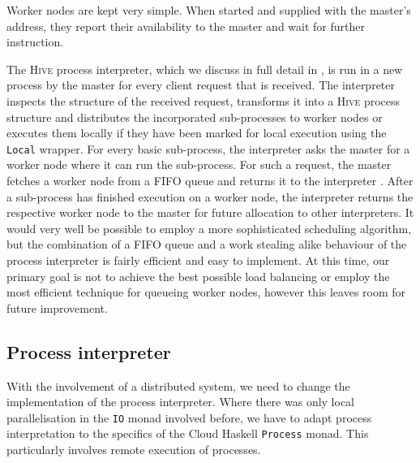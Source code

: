 Worker nodes are kept very simple. When started and supplied with the master's address, they report their availability to the master  and wait for further instruction.

The \textsc{Hive} process interpreter, which we discuss in full detail in , is run in a new process by the master for every client request that is received. The interpreter inspects the structure of the received request, transforms it into a \textsc{Hive} process structure and distributes the incorporated sub-processes to worker nodes  or executes them locally  if they have been marked for local execution using the \texttt{Local} wrapper. For every basic sub-process, the interpreter asks the master for a worker node  where it can run the sub-process. For such a request, the master fetches a worker node from a FIFO queue and returns it to the interpreter . After a sub-process has finished execution on a worker node, the interpreter returns the respective worker node to the master  for future allocation to other interpreters. It would very well be possible to employ a more sophisticated scheduling algorithm, but the combination of a FIFO queue and a work stealing \cite{} alike behaviour of the process interpreter is fairly efficient and easy to implement. At this time, our primary goal is not to achieve the best possible load balancing or employ the most efficient technique for queueing worker nodes, however this leaves room for future improvement.


\subsection{Process interpreter}
\label{chp:interpreter}
With the involvement of a distributed system, we need to change the implementation of the process interpreter. Where there was only local parallelisation in the \texttt{IO} monad involved before, we have to adapt process interpretation to the specifics of the \textsf{Cloud Haskell} \texttt{Process} monad. This particularly involves remote execution of processes.

